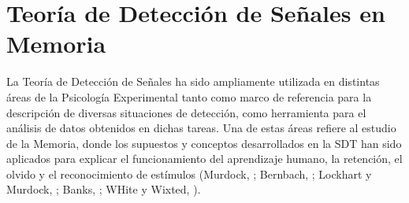 \begin{itemize}
\end{itemize}


















\section{Teoría de Detección de Señales en Memoria}

La Teoría de Detección de Señales ha sido ampliamente utilizada en distintas áreas de la Psicología Experimental tanto como marco de referencia para la descripción de diversas situaciones de detección, como herramienta para el análisis de datos obtenidos en dichas tareas. Una de estas áreas refiere al estudio de la Memoria, donde los supuestos y conceptos desarrollados en la SDT han sido aplicados para explicar el funcionamiento del aprendizaje humano, la retención, el olvido y el reconocimiento de estímulos (Murdock, \citeyear{Murdock1965}; Bernbach, \citeyear{Bernbach1967}; Lockhart y Murdock, \citeyear{Lockhart1970}; Banks, \citeyear{Banks1970}; WHite y Wixted, \citeyear{WHite1999}).\\


